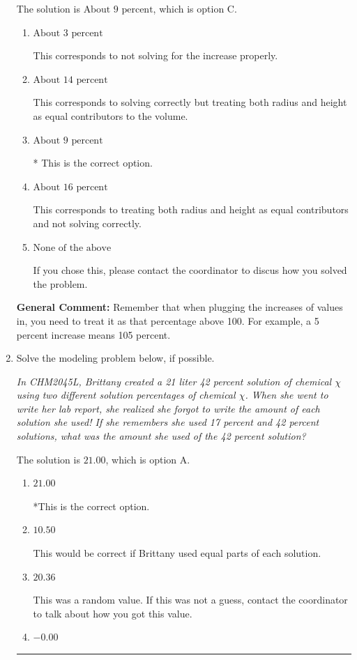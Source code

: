 \documentclass{extbook}[14pt]
\newcommand{\litem}[1]{\item #1

\rule{\textwidth}{0.4pt}}
\begin{document}
\begin{enumerate}
{The solution is \( \text{About } 9 \text{ percent} \), which is option C.\begin{enumerate}[label=\Alph*.]
\item \( \text{About } 3 \text{ percent} \)

This corresponds to not solving for the increase properly.
\item \( \text{About } 14 \text{ percent} \)

This corresponds to solving correctly but treating both radius and height as equal contributors to the volume.
\item \( \text{About } 9 \text{ percent} \)

* This is the correct option.
\item \( \text{About } 16 \text{ percent} \)

This corresponds to treating both radius and height as equal contributors and not solving correctly.
\item \( \text{None of the above} \)

If you chose this, please contact the coordinator to discus how you solved the problem.
\end{enumerate}

\textbf{General Comment:} Remember that when plugging the increases of values in, you need to treat it as that percentage above 100. For example, a 5 percent increase means 105 percent.
}
\litem{
Solve the modeling problem below, if possible.

\begin{center}
    \textit{ In CHM2045L, Brittany created a 21 liter 42 percent solution of chemical $\chi$ using two different solution percentages of chemical $\chi$. When she went to write her lab report, she realized she forgot to write the amount of each solution she used! If she remembers she used 17 percent and 42 percent solutions, what was the amount she used of the 42 percent solution? }
\end{center}


The solution is \( 21.00 \), which is option A.\begin{enumerate}[label=\Alph*.]
\item \( 21.00 \)

*This is the correct option.
\item \( 10.50 \)

This would be correct if Brittany used equal parts of each solution.
\item \( 20.36 \)

This was a random value. If this was not a guess, contact the coordinator to talk about how you got this value.
\item \( -0.00 \)


\end{enumerate}}
\end{enumerate}
\end{document}
